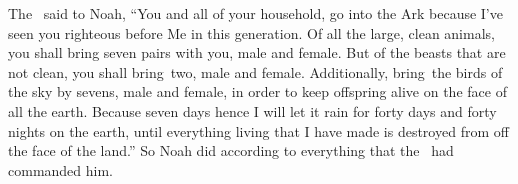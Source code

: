 
\begin{inparaenum}
   The \lord\ said to Noah, ``You and all of your household, go into the Ark because I've seen you righteous before Me in this generation.%
   Of all the large, clean animals, you shall bring seven pairs with you, male and female. But of the beasts that are not clean, you shall bring\understood{}\ two, male and female.%
   Additionally, bring\understood{}\ the birds of the sky by sevens, male and female, in order to keep offspring alive on the face of all the earth.%
   Because seven days hence I will let it rain for forty days and forty nights on the earth, until everything living that I have made is destroyed from off the face of the land.''%
   So Noah did according to everything that the \lord\ had commanded him.%


\end{inparaenum}
